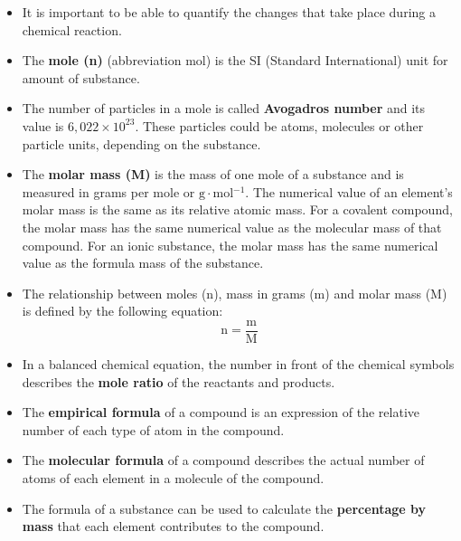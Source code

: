\pagebreak
{}
            \nopagebreak
      \label{m38712*id285735}\begin{itemize}[noitemsep]
\item It is important to be able to quantify the changes that take place during a chemical reaction.
\item The \textbf{mole (n)} (abbreviation mol) is the SI (Standard International) unit for amount of substance.
\item The number of particles in a mole is called \textbf{Avogadros number} and its value is $6,022 \times {10}^{23}$. These particles could be atoms, molecules or other particle units, depending on the substance.
\item The \textbf{molar mass (M)} is the mass of one mole of a substance and is measured in grams per mole or $\text{g} \cdot \text{mol}{}^{-1}$. The numerical value of an element's molar mass is the same as its relative atomic mass. For a covalent compound, the molar mass has the same numerical value as the molecular mass of that compound. For an ionic substance, the molar mass has the same numerical value as the formula mass of the substance.
\item The relationship between moles (n), mass in grams (m) and molar mass (M) is defined by the following equation:
\label{m38712*id285862}\nopagebreak\noindent{}
    \begin{equation*}
    \text{n}=\frac{\text{m}}{\text{M}}
      \end{equation*}
\item In a balanced chemical equation, the number in front of the chemical symbols describes the \textbf{mole ratio} of the reactants and products.
\item The \textbf{empirical formula} of a compound is an expression of the relative number of each type of atom in the compound.
\item The \textbf{molecular formula} of a compound describes the actual number of atoms of each element in a molecule of the compound.
\item The formula of a substance can be used to calculate the \textbf{percentage by mass} that each element contributes to the compound.

\end{itemize}

